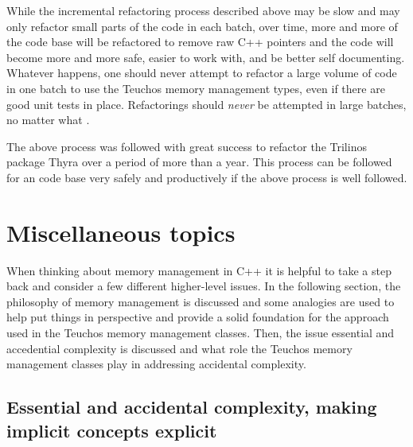\documentclass[pdf,ps2pdf,11pt]{SANDreport}
\begin{document}
While the incremental refactoring process described above may be slow
and may only refactor small parts of the code in each batch, over
time, more and more of the code base will be refactored to remove raw
C++ pointers and the code will become more and more safe, easier to
work with, and be better self documenting.  Whatever happens, one
should never attempt to refactor a large volume of code in one batch
to use the Teuchos memory management types, even if there are good
unit tests in place.  Refactorings should {}\textit{never} be
attempted in large batches, no matter what
{}\cite{WorkingEffectivelyWithLegacyCode05}.

The above process was followed with great success to refactor the
Trilinos package Thyra over a period of more than a year.  This
process can be followed for an code base very safely and productively
if the above process is well followed.


%
{}\section{Miscellaneous topics}
%

When thinking about memory management in C++ it is helpful to take a
step back and consider a few different higher-level issues.  In the
following section, the philosophy of memory management is discussed
and some analogies are used to help put things in perspective and
provide a solid foundation for the approach used in the Teuchos memory
management classes.  Then, the issue essential and accedential
complexity is discussed and what role the Teuchos memory management
classes play in addressing accidental complexity.


%
{}\subsection{Essential and accidental complexity, making implicit
concepts explicit}
\label{sec:essentail-accidental-complexity}
%
\end{document}
